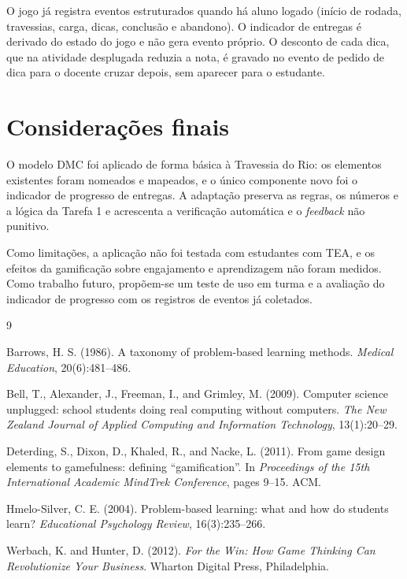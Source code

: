 \documentclass[12pt]{article}
\begin{document}
O jogo já registra eventos estruturados quando há aluno logado (início de
rodada, travessias, carga, dicas, conclusão e abandono). O indicador de entregas
é derivado do estado do jogo e não gera evento próprio. O desconto de cada dica,
que na atividade desplugada reduzia a nota, é gravado no evento de pedido de
dica para o docente cruzar depois, sem aparecer para o estudante.

\section{Considerações finais}

O modelo DMC foi aplicado de forma básica à Travessia do Rio: os elementos
existentes foram nomeados e mapeados, e o único componente novo foi o indicador
de progresso de entregas. A adaptação preserva as regras, os números e a lógica
da Tarefa 1 e acrescenta a verificação automática e o \textit{feedback} não
punitivo.

Como limitações, a aplicação não foi testada com estudantes com TEA, e os
efeitos da gamificação sobre engajamento e aprendizagem não foram medidos. Como
trabalho futuro, propõem-se um teste de uso em turma e a avaliação do
indicador de progresso com os registros de eventos já coletados.


\begin{thebibliography}{9}

Barrows, H. S. (1986). A taxonomy of problem-based learning methods.
\textit{Medical Education}, 20(6):481--486.

Bell, T., Alexander, J., Freeman, I., and Grimley, M. (2009). Computer science
unplugged: school students doing real computing without computers.
\textit{The New Zealand Journal of Applied Computing and Information
Technology}, 13(1):20--29.

Deterding, S., Dixon, D., Khaled, R., and Nacke, L. (2011). From game design
elements to gamefulness: defining ``gamification''. In \textit{Proceedings of the
15th International Academic MindTrek Conference}, pages 9--15. ACM.

Hmelo-Silver, C. E. (2004). Problem-based learning: what and how do students
learn? \textit{Educational Psychology Review}, 16(3):235--266.

Werbach, K. and Hunter, D. (2012). \textit{For the Win: How Game Thinking Can
Revolutionize Your Business}. Wharton Digital Press, Philadelphia.

\end{thebibliography}
\end{document}

